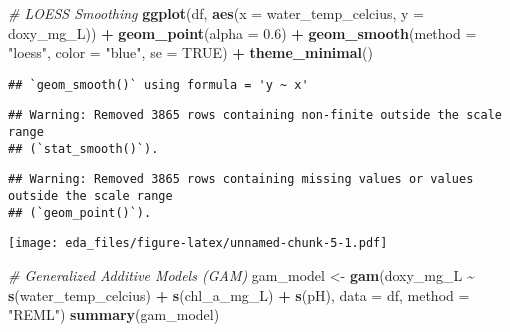 \documentclass[
]{article}
\newenvironment{Shaded}{\begin{snugshade}}{\end{snugshade}}
\newcommand{\AttributeTok}[1]{\textcolor[rgb]{0.13,0.29,0.53}{#1}}
\newcommand{\CommentTok}[1]{\textcolor[rgb]{0.56,0.35,0.01}{\textit{#1}}}
\newcommand{\ConstantTok}[1]{\textcolor[rgb]{0.56,0.35,0.01}{#1}}
\newcommand{\FloatTok}[1]{\textcolor[rgb]{0.00,0.00,0.81}{#1}}
\newcommand{\FunctionTok}[1]{\textcolor[rgb]{0.13,0.29,0.53}{\textbf{#1}}}
\newcommand{\NormalTok}[1]{#1}
\newcommand{\OtherTok}[1]{\textcolor[rgb]{0.56,0.35,0.01}{#1}}
\newcommand{\SpecialCharTok}[1]{\textcolor[rgb]{0.81,0.36,0.00}{\textbf{#1}}}
\newcommand{\StringTok}[1]{\textcolor[rgb]{0.31,0.60,0.02}{#1}}
\begin{document}
\begin{Shaded}
\begin{Highlighting}[]
\CommentTok{\# LOESS Smoothing}
\FunctionTok{ggplot}\NormalTok{(df, }\FunctionTok{aes}\NormalTok{(}\AttributeTok{x =}\NormalTok{ water\_temp\_celcius, }\AttributeTok{y =}\NormalTok{ doxy\_mg\_L)) }\SpecialCharTok{+}
  \FunctionTok{geom\_point}\NormalTok{(}\AttributeTok{alpha =} \FloatTok{0.6}\NormalTok{) }\SpecialCharTok{+}
  \FunctionTok{geom\_smooth}\NormalTok{(}\AttributeTok{method =} \StringTok{"loess"}\NormalTok{, }\AttributeTok{color =} \StringTok{"blue"}\NormalTok{, }\AttributeTok{se =} \ConstantTok{TRUE}\NormalTok{) }\SpecialCharTok{+}
  \FunctionTok{theme\_minimal}\NormalTok{()}
\end{Highlighting}
\end{Shaded}

\begin{verbatim}
## `geom_smooth()` using formula = 'y ~ x'
\end{verbatim}

\begin{verbatim}
## Warning: Removed 3865 rows containing non-finite outside the scale range
## (`stat_smooth()`).
\end{verbatim}

\begin{verbatim}
## Warning: Removed 3865 rows containing missing values or values outside the scale range
## (`geom_point()`).
\end{verbatim}

\texttt{[image: eda\_files/figure-latex/unnamed-chunk-5-1.pdf]}

\begin{Shaded}
\begin{Highlighting}[]
\CommentTok{\# Generalized Additive Models (GAM)}
\NormalTok{gam\_model }\OtherTok{\textless{}{-}} \FunctionTok{gam}\NormalTok{(doxy\_mg\_L }\SpecialCharTok{\textasciitilde{}} \FunctionTok{s}\NormalTok{(water\_temp\_celcius) }\SpecialCharTok{+} \FunctionTok{s}\NormalTok{(chl\_a\_mg\_L) }\SpecialCharTok{+} \FunctionTok{s}\NormalTok{(pH),}
                 \AttributeTok{data =}\NormalTok{ df, }\AttributeTok{method =} \StringTok{"REML"}\NormalTok{)}
\FunctionTok{summary}\NormalTok{(gam\_model)}
\end{Highlighting}
\end{Shaded}
\end{document}
